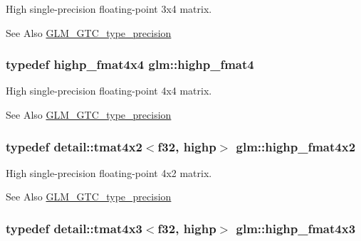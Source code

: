 High single-\/precision floating-\/point 3x4 matrix. \begin{DoxySeeAlso}{See Also}
\hyperlink{group__gtc__type__precision}{G\-L\-M\-\_\-\-G\-T\-C\-\_\-type\-\_\-precision} 
\end{DoxySeeAlso}
\hypertarget{group__gtc__type__precision_ga4c7c9823ade7c29e29b5a313949ae502}{
\subsubsection[{highp\-\_\-fmat4}]{\setlength{\rightskip}{0pt plus 5cm}typedef highp\-\_\-fmat4x4 {\bf glm\-::highp\-\_\-fmat4}}}\label{group__gtc__type__precision_ga4c7c9823ade7c29e29b5a313949ae502}
High single-\/precision floating-\/point 4x4 matrix. \begin{DoxySeeAlso}{See Also}
\hyperlink{group__gtc__type__precision}{G\-L\-M\-\_\-\-G\-T\-C\-\_\-type\-\_\-precision} 
\end{DoxySeeAlso}
\hypertarget{group__gtc__type__precision_gab3d688f05a884be93c647bce2d8a46f4}{
\subsubsection[{highp\-\_\-fmat4x2}]{\setlength{\rightskip}{0pt plus 5cm}typedef detail\-::tmat4x2$<$f32, highp$>$ {\bf glm\-::highp\-\_\-fmat4x2}}}\label{group__gtc__type__precision_gab3d688f05a884be93c647bce2d8a46f4}
High single-\/precision floating-\/point 4x2 matrix. \begin{DoxySeeAlso}{See Also}
\hyperlink{group__gtc__type__precision}{G\-L\-M\-\_\-\-G\-T\-C\-\_\-type\-\_\-precision} 
\end{DoxySeeAlso}
\hypertarget{group__gtc__type__precision_ga07f7578fc5a4dd8cdd8a532db25d535f}{
\subsubsection[{highp\-\_\-fmat4x3}]{\setlength{\rightskip}{0pt plus 5cm}typedef detail\-::tmat4x3$<$f32, highp$>$ {\bf glm\-::highp\-\_\-fmat4x3}}}\label{group__gtc__type__precision_ga07f7578fc5a4dd8cdd8a532db25d535f}
